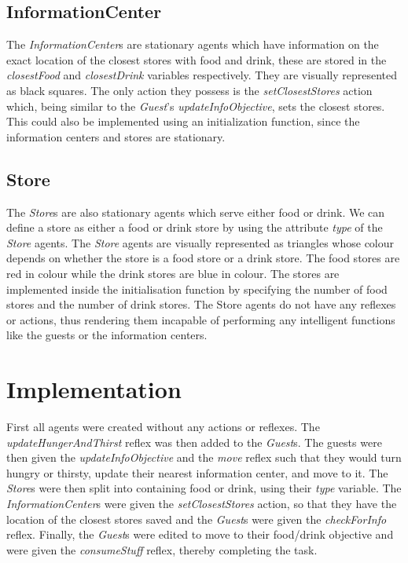 \documentclass[a4paper]{article}
\begin{document}
\subsection{InformationCenter}
The \textit{InformationCenter}s are stationary agents which have information on the exact location of the closest stores with food and drink, these are stored in the \textit{closestFood} and \textit{closestDrink} variables respectively. They are visually represented as black squares. The only action they possess is the \textit{setClosestStores} action which, being similar to the \textit{Guest}'s \textit{updateInfoObjective}, sets the closest stores. This could also be implemented using an initialization function, since the information centers and stores are stationary.

\subsection{Store}
The \textit{Store}s are also stationary agents which serve either food or drink. We can define a store as either a food or drink store by using the attribute \textit{type} of the \textit{Store} agents. The \textit{Store} agents are visually represented as triangles whose colour depends on whether the store is a food store or a drink store. The food stores are red in colour while the drink stores are blue in colour. The stores are implemented inside the initialisation function by specifying the number of food stores and the number of drink stores. The Store agents do not have any reflexes or actions, thus rendering them incapable of performing any intelligent functions like the guests or the information centers.  

\section{Implementation}
First all agents were created without any actions or reflexes. The \textit{updateHungerAndThirst} reflex was then added to the \textit{Guest}s. The guests were then given the \textit{updateInfoObjective} and the \textit{move} reflex such that they would turn hungry or thirsty, update their nearest information center, and move to it. The \textit{Store}s were then split into containing food or drink, using their \textit{type} variable. The \textit{InformationCenter}s were given the \textit{setClosestStores} action, so that they have the location of the closest stores saved and the \textit{Guest}s were given the \textit{checkForInfo} reflex. Finally, the \textit{Guest}s were edited to move to their food/drink objective and were given the \textit{consumeStuff} reflex, thereby completing the task.
\end{document}
